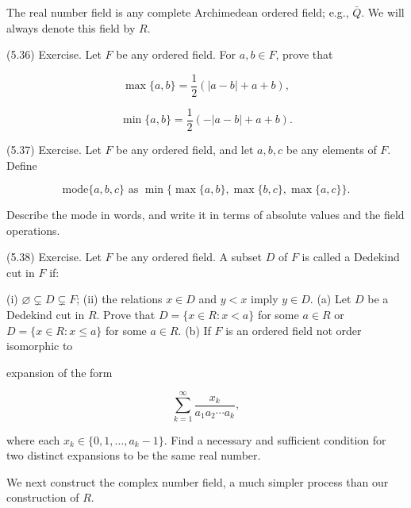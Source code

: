 The real number field is any complete Archimedean ordered field; e.g., $\bar{Q}$. We will always denote this field by $R$.

(5.36) Exercise. Let $F$ be any ordered field. For $a, b \in F$, prove that

$$\max \{a, b\} = \frac{1}{2} (|a - b| + a + b),$$

$$\min \{a, b\} = \frac{1}{2} (-|a - b| + a + b).$$

(5.37) Exercise. Let $F$ be any ordered field, and let $a, b, c$ be any elements of $F$. Define

$$\text{mode}\{a, b, c\} \text{ as } \min \{\max\{a, b\}, \max\{b, c\}, \max\{a, c\}\}.$$

Describe the mode in words, and write it in terms of absolute values and the field operations.

(5.38) Exercise. Let $F$ be any ordered field. A subset $D$ of $F$ is called a Dedekind cut in $F$ if:

(i) $\varnothing \subsetneq D \subsetneq F$;
(ii) the relations $x \in D$ and $y < x$ imply $y \in D$.
(a) Let $D$ be a Dedekind cut in $R$. Prove that $D = \{x \in R : x < a\}$ for some $a \in R$ or $D = \{x \in R : x \leq a\}$ for some $a \in R$.
(b) If $F$ is an ordered field not order isomorphic to

expansion of the form

$$\sum_{k=1}^{\infty} \frac{x_k}{a_1 a_2 \cdots a_k},$$

where each $x_k \in \{0, 1, \ldots, a_k - 1\}$. Find a necessary and sufficient condition for two distinct expansions to be the same real number.

We next construct the complex number field, a much simpler process than our construction of $R$.